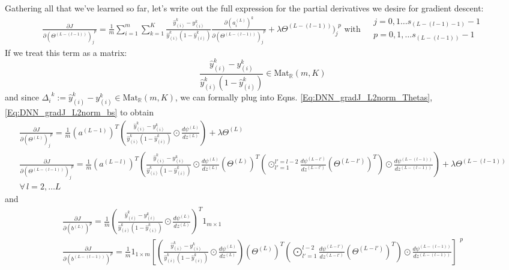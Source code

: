 \documentclass[10pt]{amsart}
\begin{document}
\begin{multicols*}{2}
Gathering all that we've learned so far, let's write out the full expression for the partial derivatives we desire for gradient descent:  
\begin{equation} %
\begin{gathered}
\frac{ \partial J }{ \partial ( \Theta^{(L-(l-1))})_j^{\  \  p} } = \frac{1}{m} \sum_{i=1}^m \sum_{k=1}^K  \frac{\widehat{y}_{(i)}^k - y_{(i)}^k }{ \widehat{y}_{(i)}^k (1 - \widehat{y}_{(i)}^k )}  \frac{ \partial (a_i^{(L)})^k }{ \partial (\Theta^{(L-(l-1))})_j^{\  \  p} } + \lambda  \Theta^{(L-(l-1))})_j^{\  \  p} \text{ with } \begin{aligned} & j = 0,1\dots s_{(L-(l-1)-1)}-1 \\ & p = 0,1,\dots s_{(L-(l-1))} -1 \end{aligned}
\end{gathered}	
\end{equation}
If we treat this term as a matrix:
\[
\frac{\widehat{y}_{(i)}^k - y_{(i)}^k }{ \widehat{y}_{(i)}^k (1 - \widehat{y}_{(i)}^k )} \in \text{Mat}_{\mathbb{R}}(m,K) 
\]
and since $\Delta_i^{\  \   k} := \widehat{y}_{(i)}^k - y_{(i)}^k \in \text{Mat}_{\mathbb{R}}(m,K)$, we can formally plug into Eqns. \ref{Eq:DNN_gradJ_L2norm_Thetas}, \ref{Eq:DNN_gradJ_L2norm_bs} to obtain 
\[
\begin{gathered}
\frac{ \partial J }{ \partial (\Theta^{(L)})_j^{\  \  p} } = \frac{1}{m} (a^{(L-1)})^T \left(  \frac{\widehat{y}_{(i)}^k - y_{(i)}^k }{ \widehat{y}_{(i)}^k (1 - \widehat{y}_{(i)}^k )} \odot \frac{d\psi^{(L)} }{ dz^{(L)} } \right) + \lambda \Theta^{(L)}	\\
\frac{ \partial J }{ \partial (\Theta^{(L-(l-1))})_j^{\  \  p} } = \frac{1}{m} (a^{(L-l)})^T \left(  \frac{\widehat{y}_{(i)}^k - y_{(i)}^k }{ \widehat{y}_{(i)}^k (1 - \widehat{y}_{(i)}^k )} \odot \frac{d\psi^{(L)}}{dz^{(L)} } (\Theta^{(L)})^T \left( \odot_{l'=1}^{l'=l-2} \frac{d\psi^{(L-l')}}{dz^{(L-l') } } (\Theta^{(L-l')})^T \right) \odot \frac{d\psi^{(L-(l-1)) } }{ dz^{(L-(l-1)) } } \right) + \lambda \Theta^{(L-(l-1)) } \\
\forall \, l = 2,\dots L 
\end{gathered}
\]
and 
\[
\begin{gathered}
\frac{\partial J}{ \partial (b^{(L)})^p } = \frac{1}{m} ( \frac{\widehat{y}_{(i)}^k - y_{(i)}^k }{ \widehat{y}_{(i)}^k (1 - \widehat{y}_{(i)}^k )} \odot \frac{d\psi^{(L)}}{dz^{(L)}})^T 1_{m\times 1}   \\
\frac{ \partial J }{ \partial (b^{(L-(l-1) )} )^p } =  \frac{1}{m}  1_{1\times m } \left[ (  \frac{\widehat{y}_{(i)}^k - y_{(i)}^k }{ \widehat{y}_{(i)}^k (1 - \widehat{y}_{(i)}^k )} \odot \frac{d\psi^{(L)} }{ dz^{(L)} } )(\Theta^{(L)})^T \left( \bigodot^{l-2}_{ l'=1} \frac{d \psi^{(L-l')} }{ dz^{(L-l')}} (\Theta^{(L-l')})^T \right) \odot \frac{d\psi^{ (L-(l-1))} }{ dz^{(L-(l-1))}} \right]^{\  \  p } \\

\end{gathered}\]
\end{multicols*}
\end{document}

